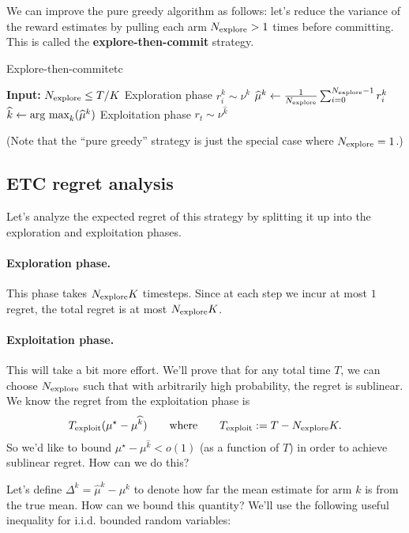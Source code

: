 \documentclass[\main/main]{subfiles}
\begin{document}
We can improve the pure greedy algorithm as follows:
let's reduce the variance of the reward estimates by pulling each arm $N_{\text{explore}} > 1$ times before committing. This is called the \textbf{explore-then-commit} strategy.
\begin{definition}{Explore-then-commit}{etc}
    \begin{algorithmic}
        \State \textbf{Input:} $N_{\text{explore}} \le T/K$
        \Comment Exploration phase
        \State $r^k_i \sim \nu^k$
        \EndFor
        \State $\widehat \mu^k \gets \frac{1}{N_{\text{explore}}} \sum_{i=0}^{N_{\text{explore}}-1} r^k_i$
        \EndFor
        \State $\widehat k \gets \operatorname*{\textrm{arg\ max}}_k (\widehat \mu^k)$
        \Comment Exploitation phase
        \State $r_t \sim \nu^{\hat k}$
        \EndFor
    \end{algorithmic}
\end{definition}
(Note that the ``pure greedy'' strategy is just the special case where $N_{\text{explore}} = 1$.)

\subsection{ETC regret analysis} \label{sec:etc-regret-analysis}

Let's analyze the expected regret of this strategy by splitting it up into the exploration and exploitation phases.

\paragraph*{Exploration phase.} This phase takes $N_{\text{explore}} K$ timesteps. Since at each step we incur at most $1$ regret, the total regret is at most $N_{\text{explore}} K$.

\paragraph*{Exploitation phase.} This will take a bit more effort. We'll prove that for any total time $T$, we can choose $N_{\text{explore}}$ such that with arbitrarily high probability, the regret is sublinear. We know the regret from the exploitation phase is
\[
    T_{\text{exploit}} (\mu^\star - \mu^{\widehat k}) \qquad \text{where} \qquad T_{\text{exploit}} := T - N_{\text{explore}} K.
\]
So we'd like to bound $\mu^\star - \mu^{\hat k} < o(1)$ (as a function of $T$) in order to achieve sublinear regret. How can we do this?

Let's define $\Delta^k = \hat \mu^k - \mu^k$ to denote how far the mean estimate for arm $k$ is from the true mean. How can we bound this quantity? We'll use the following useful inequality for i.i.d. bounded random variables:
\end{document}
